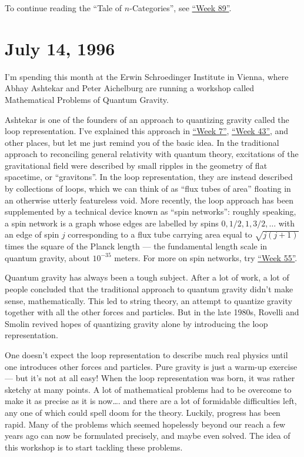 \documentclass{article}
\begin{document}
To continue reading the ``Tale of \(n\)-Categories'', see
\protect\hyperlink{week89}{``Week 89''}.



\hypertarget{week85}{%
\section{July 14, 1996}\label{week85}}

I'm spending this month at the Erwin Schroedinger Institute in Vienna,
where Abhay Ashtekar and Peter Aichelburg are running a workshop called
Mathematical Problems of Quantum Gravity.

Ashtekar is one of the founders of an approach to quantizing gravity
called the loop representation. I've explained this approach in
\protect\hyperlink{week7}{``Week 7''}, \protect\hyperlink{week43}{``Week
43''}, and other places, but let me just remind you of the basic idea.
In the traditional approach to reconciling general relativity with
quantum theory, excitations of the gravitational field were described by
small ripples in the geometry of flat spacetime, or ``gravitons''. In
the loop representation, they are instead described by collections of
loops, which we can think of as ``flux tubes of area'' floating in an
otherwise utterly featureless void. More recently, the loop approach has
been supplemented by a technical device known as ``spin networks'':
roughly speaking, a spin network is a graph whose edges are labelled by
spins \(0,1/2,1,3/2,\ldots\) with an edge of spin \(j\) corresponding to
a flux tube carrying area equal to \(\sqrt{j(j+1)}\) times the square of
the Planck length --- the fundamental length scale in quantum gravity,
about \(10^{-35}\) meters. For more on spin networks, try
\protect\hyperlink{week55}{``Week 55''}.

Quantum gravity has always been a tough subject. After a lot of work, a
lot of people concluded that the traditional approach to quantum gravity
didn't make sense, mathematically. This led to string theory, an attempt
to quantize gravity together with all the other forces and particles.
But in the late 1980s, Rovelli and Smolin revived hopes of quantizing
gravity alone by introducing the loop representation.

One doesn't expect the loop representation to describe much real physics
until one introduces other forces and particles. Pure gravity is just a
warm-up exercise --- but it's not at all easy! When the loop
representation was born, it was rather sketchy at many points. A lot of
mathematical problems had to be overcome to make it as precise as it is
now\ldots. and there are a lot of formidable difficulties left, any one
of which could spell doom for the theory. Luckily, progress has been
rapid. Many of the problems which seemed hopelessly beyond our reach a
few years ago can now be formulated precisely, and maybe even solved.
The idea of this workshop is to start tackling these problems.
\end{document}
